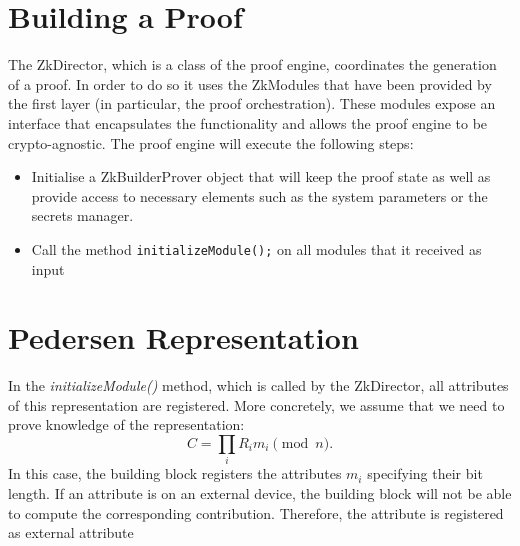 \section{Building a Proof}

The ZkDirector, which is a class of the proof engine, coordinates the generation of a proof.
In order to do so it uses the ZkModules that have been provided by the first layer (in particular, the 
proof orchestration). 
These modules expose an interface that encapsulates the functionality and allows the proof engine to be crypto-agnostic. 
The proof engine will execute the following steps:
\begin{itemize}
\item Initialise a ZkBuilderProver object that will keep the proof state as well as provide access to necessary elements such as the system parameters or the secrets manager.
\item Call the method \texttt{initializeModule();}  on all modules that it received as input


\end{itemize}




\section{Pedersen Representation}

In the \emph{initializeModule()} method, which is called by the ZkDirector, all attributes of this representation are registered. 
More concretely, we assume that we need  to prove knowledge of the representation:
\begin{displaymath}
C = \prod_i R_i m_i \pmod n .
\end{displaymath}
In this case, the building block registers the attributes $m_i$ specifying their bit length.
If an attribute is on an external device, the building block will not be able to compute the corresponding contribution.
Therefore, the attribute is registered as external attribute
